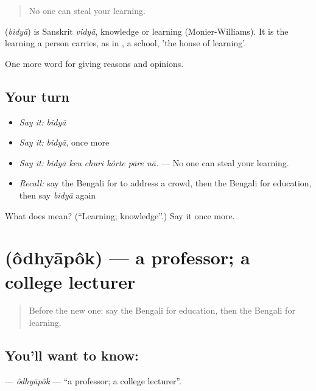 \begin{quote}
No one can steal your learning.
\end{quote}

\begin{cousinweb}
\textbf{} (\emph{bidyā}) is Sanskrit \emph{vidyā}, knowledge or learning (Monier-Williams). It is the learning a person carries, as in , a school, 'the house of learning'.
\end{cousinweb}

\begin{grammarlens}[title={What you've built}]
One more word for giving reasons and opinions.
\end{grammarlens}

\subsection*{Your turn}
\begin{itemize}
\raggedright
  \item \emph{Say it:} \emph{bidyā}
  \item \emph{Say it:} \emph{bidyā}, once more
  \item \emph{Say it:} \emph{bidyā keu churi kôrte pāre nā.} — No one can steal your learning.
  \item \emph{Recall:} say the Bengali for to address a crowd, then the Bengali for education, then say \emph{bidyā} again
\end{itemize}

\begin{tcolorbox}[breakable,colback=teal!4,colframe=teal!35!black,title={Before you move on}]
What does  mean? (\textquotedblleft{}Learning; knowledge\textquotedblright{}.) Say it once more.
\end{tcolorbox}
\section[\texorpdfstring{\bn{অধ্যাপক} (ôdhyāpôk)}{অধ্যাপক (ôdhyāpôk)}]{ (ôdhyāpôk) — a professor; a college lecturer}

\label{lesson:BN-C361-odhyapok}



\begin{quote}
Before the new one: say the Bengali for education, then the Bengali for learning.
\end{quote}

\subsection*{You'll want to know: }
\textbf{} — \emph{ôdhyāpôk} — \textquotedblleft{}a professor; a college lecturer\textquotedblright{}.

